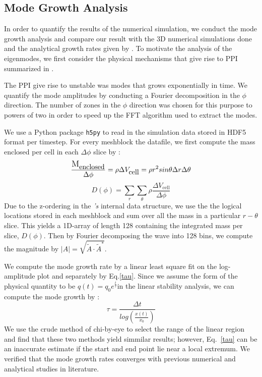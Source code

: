 \documentclass[iop,revtex4]{emulateapj}
\begin{document}
\subsection{Mode Growth Analysis}
\par In order to quantify the results of the numerical simulation, we conduct the mode growth analysis and compare our result with the 3D numerical simulations done \cite{Hawley:1991A} and the analytical growth rates given by \cite{Goldreich:1986A}. To motivate the analysis of the eigenmodes, we first consider the physical mechanisms that give rise to \ac{PPI} summarized in \cite{Narayan:1989A}.
\par The \ac{PPI} give rise to unstable was modes that grows exponentially in time. We quantify the mode amplitudes by conducting a Fourier decomposition in the $\phi$ direction. The number of zones in the $\phi$ direction was chosen for this purpose to powers of two in order to speed up the \ac{FFT} algorithm used to extract the modes. 
\par We use a Python package \texttt{h5py} to read in the simulation data stored in HDF5 format per timestep. For every meshblock the datafile, we first compute the mass enclosed per cell in each $\Delta\phi$ slice by :
\begin{equation}
\frac{\mbox{\large M}_{\mbox{enclosed}}}{\Delta\phi} = \rho\Delta V_{\mbox{cell}} = \rho r^2 sin\theta \Delta r \Delta\theta
\end{equation}
\begin{equation}
D(\phi) = \sum_r \sum_\theta \rho \frac{\Delta V_{\mbox{cell}}}{\Delta\phi}
\end{equation}
Due to the z-ordering in the \app\textit{'s} internal data structure, we use the the logical locations stored in each meshblock and sum over all the mass in a particular $r-\theta$ slice. This yields a 1D-array of length 128 containing the integrated mass per slice, $D(\phi)$. Then by Fourier decomposing the wave into 128 bins, we compute the magnitude by $|A|=\sqrt{\tilde{A}\cdot \tilde{A}^*}$. 
\par We compute the mode growth rate by a linear least square fit on the log-amplitude plot and separately by Eq.\ref{tau}. Since we assume the form of the physical quantity to be $q(t)=q_0 e^{\frac{t}{\tau}}$in the linear stability analysis, we can compute the mode growth by : 
\begin{equation}
\tau = \frac{\Delta t}{log(\frac{x(t)}{x_0})}
\label{tau}
\end{equation}
We use the crude method of chi-by-eye to select the range of the linear region and find that these two methods yield simmilar results; however, Eq.~\ref{tau} can be an inaccurate estimate if the start and end point lie near a local extremum. We verified that the mode growth rates converges with previous numerical and analytical studies in literature.
\end{document}
